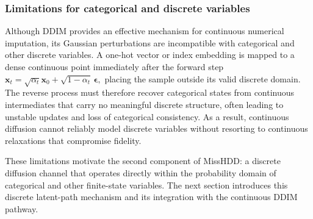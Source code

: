 \documentclass[times, review, 10pt]{elsarticle}
\begin{document}




\subsubsection{Limitations for categorical and discrete variables}

Although DDIM provides an effective mechanism for continuous numerical
imputation, its Gaussian perturbations are incompatible with categorical and
other discrete variables. A one-hot vector or index embedding is mapped to a
dense continuous point immediately after the forward step
\(
\mathbf{x}_t=\sqrt{\alpha_t}\mathbf{x}_0+\sqrt{1-\alpha_t}\,\boldsymbol{\epsilon},
\)
placing the sample outside its valid discrete domain. The reverse process
must therefore recover categorical states from continuous intermediates that
carry no meaningful discrete structure, often leading to unstable updates
and loss of categorical consistency. As a result, continuous diffusion cannot
reliably model discrete variables without resorting to continuous
relaxations that compromise fidelity.

These limitations motivate the second component of MissHDD: a discrete
diffusion channel that operates directly within the probability domain of
categorical and other finite-state variables. The next section introduces
this discrete latent-path mechanism and its integration with the continuous
DDIM pathway.
\end{document}
